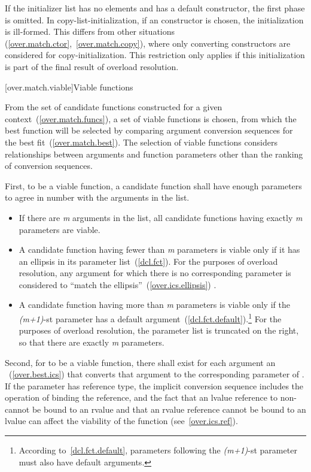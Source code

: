 If the initializer list has no elements and  has a default constructor,
the first phase is omitted.
In copy-list-initialization, if an  constructor is
chosen, the initialization is ill-formed. \enternote
This differs from other situations (\ref{over.match.ctor},~\ref{over.match.copy}),
where only converting constructors are considered for copy-initialization.
This restriction only
applies if this initialization is part of the final result of overload
resolution. \exitnote

[over.match.viable]{Viable functions}%

\pnum
From the set of candidate functions constructed for a given
context~(\ref{over.match.funcs}), a set of viable functions is
chosen, from which the best function will be selected by
comparing argument conversion sequences for the best fit~(\ref{over.match.best}).
The selection of viable functions considers
relationships between arguments and function parameters other
than the ranking of conversion sequences.

\pnum
{}%
%
First, to be a viable function, a candidate function shall have
enough parameters to agree in number with the arguments in the
list.

\begin{itemize}
\item
If there are
\textit{m}
arguments in the list, all candidate
functions having exactly
\textit{m}
parameters are viable.
\item
A candidate function having fewer than
\textit{m}
parameters is
viable only if it has an ellipsis in its parameter list~(\ref{dcl.fct}).
For the purposes of overload resolution,
any argument for which there is no corresponding parameter is
considered to ``match the ellipsis''~(\ref{over.ics.ellipsis}) .
\item
A candidate function having more than
\textit{m}
parameters is viable
only if the
\textit{(m+1)}-st
parameter has a default
argument~(\ref{dcl.fct.default}).\footnote{According to~\ref{dcl.fct.default},
parameters following the
\textit{(m+1)}-st
parameter must also have default arguments.}
For the purposes of overload
resolution, the parameter list is truncated on the right, so
that there are exactly
\textit{m}
parameters.
\end{itemize}

\pnum
Second, for
to be a viable function, there shall exist for each
argument an
~(\ref{over.best.ics}) that
converts that argument to the corresponding parameter of
.
If the parameter has reference type, the implicit conversion sequence
includes the operation of binding the reference, and the fact that
an lvalue reference to non- cannot be bound to an rvalue
and that an rvalue reference cannot be bound to an lvalue
can affect
the viability of the function (see~\ref{over.ics.ref}).

